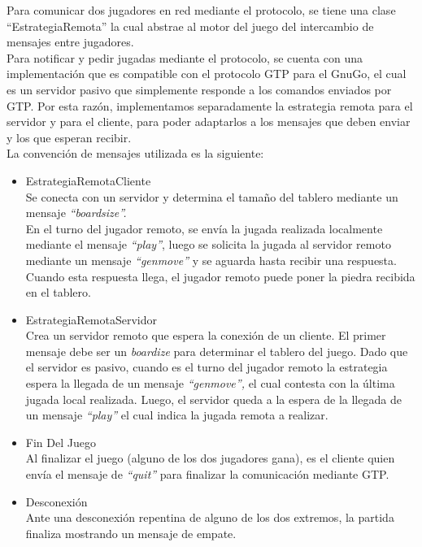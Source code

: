 \documentclass[11pt]{article}
\begin{document}
  Para comunicar dos jugadores en red mediante el protocolo, se tiene una clase ``EstrategiaRemota'' la cual
abstrae al motor del juego del intercambio de mensajes entre jugadores. \\
Para notificar y pedir jugadas mediante el protocolo, 
se cuenta con una implementaci\'on que es compatible con el protocolo GTP para el GnuGo, el cual es un 
servidor pasivo que simplemente responde a los comandos enviados por GTP. Por esta raz\'on, implementamos
separadamente la estrategia remota para el servidor y para el cliente, para poder adaptarlos a los mensajes
que deben enviar y los que esperan recibir. \\ 
La convenci\'on de mensajes utilizada es la siguiente: 
\begin{itemize}
 \item EstrategiaRemotaCliente \\
      Se conecta con un servidor y determina el tama\~no del tablero mediante un mensaje \textit{``boardsize''.}\\
      En el turno del jugador remoto, se env\'ia la jugada realizada localmente mediante el mensaje \textit{``play''}, 
      luego se solicita la jugada al servidor remoto mediante un mensaje\textit{ ``genmove''} y se aguarda hasta recibir una respuesta. 
      Cuando esta respuesta llega, el jugador remoto puede poner la piedra recibida en el tablero. 
 \item EstrategiaRemotaServidor\\
      Crea un servidor remoto que espera la conexi\'on de un cliente. El primer mensaje debe ser un \textit{boardize} para determinar el tablero del juego.
      Dado que el servidor es pasivo, cuando es el turno del jugador remoto la estrategia espera la llegada de un mensaje \textit{``genmove'',} 
      el cual contesta con la \'ultima jugada local realizada. Luego, el servidor queda a la espera de la llegada de un mensaje 
     \textit{ ``play''} el cual indica la jugada remota a realizar.
  \item Fin Del Juego\\
      Al finalizar el juego (alguno de los dos jugadores gana), es el cliente quien env\'ia el mensaje de \textit{``quit''} para finalizar
      la comunicaci\'on mediante GTP.
  \item Desconexi\'on\\
      Ante una desconexi\'on repentina de alguno de los dos extremos, la partida finaliza mostrando un mensaje de empate.
\end{itemize}
\end{document}
